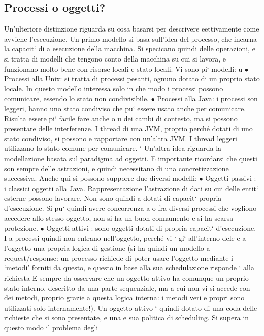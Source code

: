 \documentclass[a4paper,12pt]{article}
\begin{document}
\subsection{Processi o oggetti?}
Un'ulteriore distinzione riguarda su cosa basarsi per descrivere eettivamente
come avviene l'esecuzione.
Un primo modello si basa sull'idea del processo, che incarna la capacit` di
a
esecuzione della macchina. Si specicano quindi delle operazioni, e si tratta di
modelli che tengono conto della macchina su cui si lavora, e funzionano molto
bene con risorse locali e stato locali. Vi sono pi` modelli:
u
$\bullet$ Processi alla Unix: si tratta di processi pesanti, ognuno dotato di un
proprio stato locale. In questo modello interessa solo in che modo i processi
possono comunicare, essendo lo stato non condivisibile.
$\bullet$ Processi alla Java: i processi son leggeri, hanno uno stato condiviso che
pu` essere usato anche per comunicare. Risulta essere pi` facile fare anche
o
u
dei cambi di contesto, ma si possono presentare delle interferenze.
I thread di una JVM, proprio perché dotati di uno stato condiviso, si possono
e
rapportare con un'altra JVM. I thread leggeri utilizzano lo stato comune per
comunicare.
`
Un'altra idea riguarda la modellazione basata sul paradigma ad oggetti. E
importante ricordarsi che questi son sempre delle astrazioni, e quindi necessitano
di una concretizzazione successiva. Anche qui si possono supporre due diversi
modelli:
$\bullet$ Oggetti passivi : i classici oggetti alla Java. Rappresentazione l'astrazione
di dati su cui delle entit` esterne possono lavorare. Non sono quindi
a
dotati di capacit` propria d'esecuzione. Si pu` quindi avere concorrenza
a
o
fra diversi processi che vogliono accedere allo stesso oggetto, non si ha un
buon connamento e si ha scarsa protezione.
$\bullet$ Oggetti attivi : sono oggetti dotati di propria capacit` d'esecuzione. I
a
processi quindi non entrano nell'oggetto, perché vi ` gi` all'interno dele
e a
l'oggetto una propria logica di gestione (si ha quindi un modello a request/response: un processo richiede di poter
usare l'oggetto mediante i
{`}metodi' forniti da questo, e questo in base alla sua schedulazione risponde
`
alla richiesta E sempre da osservare che un oggetto attivo ha comunque
un proprio stato interno, descritto da una parte sequenziale, ma a cui
non vi si accede con dei metodi, proprio grazie a questa logica interna: i
metodi veri e propri sono utilizzati solo internamente!). Un oggetto attivo
` quindi dotato di una coda delle richieste che si sono presentate, e una
e
sua politica di scheduling. Si supera in questo modo il problema degli
\end{document}
